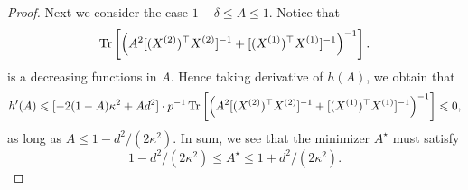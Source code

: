 \begin{proof}
Next we consider the case $1-\delta\le A\le 1$. Notice that
$$\operatorname{Tr}\left[\left(A^2[(X^{(2)})^\top X^{(2)}]^{-1} +  [(X^{(1)})^\top X^{(1)}]^{-1}\right)^{-1}\right].$$
is a decreasing functions in $A$. Hence taking derivative of $h(A)$, we obtain that
\begin{align}\label{h'(A)2}
	h'(A)\leqslant [-2(1-A)\kappa^2 + Ad^2] \cdot p^{-1} \operatorname{Tr}\left[\left(A^2[(X^{(2)})^\top X^{(2)}]^{-1} + [(X^{(1)})^\top X^{(1)}]^{-1}\right)^{-1}\right]\leqslant 0,
\end{align}
as long as $A \le 1-d^2/(2\kappa^2)$. In sum, we see that the minimizer $A^\star$ must satisfy
$$1-d^2/(2\kappa^2)\le A^\star \le 1+d^2/(2\kappa^2).$$ 



\end{proof}
